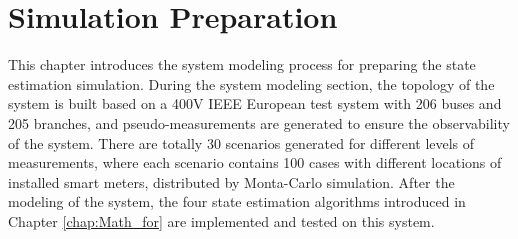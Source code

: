 \chapter{Simulation Preparation} \label{chap:Simulation Preparation}
This chapter introduces the system modeling process for preparing the state estimation simulation. During the system modeling section, the topology of the system is built based on a 400V IEEE European test system with 206 buses and 205 branches, and pseudo-measurements are generated to ensure the observability of the system. There are totally 30 scenarios generated for different levels of measurements, where each scenario contains 100 cases with different locations of installed smart meters, distributed by Monta-Carlo simulation. After the modeling of the system, the four state estimation algorithms introduced in Chapter \ref{chap:Math_for} are implemented and tested on this system.

